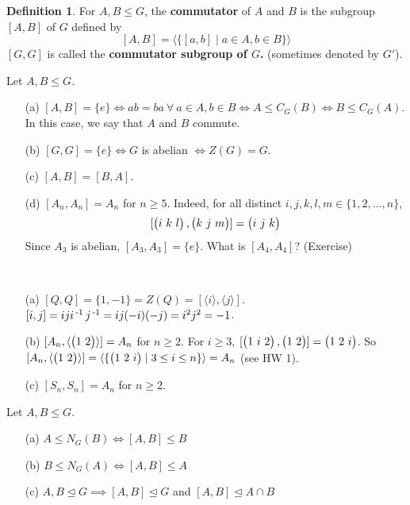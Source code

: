 \documentclass[11pt]{book}
\theoremstyle{definition}   \newtheorem{defn}[counter]{Definition} %
\newcommand{\nsg}{\mathrel{\unlhd}}   \newcommand{\ind}{\parindent24pt}   \newcommand{\vn}{\varnothing}
\newcommand{\vs}{\vspace{8pt}}
\numberwithin{counter}{chapter}
\begin{document}
\vs

\begin{defn}
For $A,B \leq G$, the \textbf{commutator} of $A$ and $B$ is the subgroup $[A,B]$ of $G$ defined by
	\[[A,B] = \langle \{[a,b] \mid a \in A, b \in B\}\rangle \]
$[G,G]$ is called the \textbf{commutator subgroup of $G$.} (sometimes denoted by $G'$).
\end{defn}

\vs

\begin{remark}
Let $A,B \leq G$. \\
\begin{enumerate}
\item[(a)] $[A,B] = \{e\} \iff ab = ba \ \forall\ a\in A, b \in B \iff A \leq C_G(B) \iff B \leq C_G(A)$. In this case, we say that $A$ and $B$ commute.
\item[(b)] $[G,G] = \{e\} \iff G$ is abelian $\iff Z(G) = G$.
\item[(c)] $[A,B] = [B,A]$.
\item[(d)] $[A_n,A_n] = A_n$ for $n \geq 5$. Indeed, for all distinct $i,j,k,l,m \in \{1,2,\dots,n\}$,
	\[[\cyc{i\ k\ l},\cyc{k\ j\ m}] = \cyc{i\ j\ k} \]
Since $A_3$ is abelian, $[A_3,A_3] = \{e\}$. What is $[A_4,A_4]$? (Exercise)
\end{enumerate}
\end{remark}

\vs

\begin{example}
\ \\
\begin{enumerate}
\item[(a)] $[Q,Q] = \{1,-1\} = Z(Q) = [\langle i \rangle, \langle j \rangle] $. $[i,j] = iji\operatorname{^{-1}} j\operatorname{^{-1}} = ij(-i)(-j) = i^2j^2 = -1$.
\item[(b)] $[A_n,\langle \begin{pmatrix} 1 \ 2 \end{pmatrix} \rangle] = A_n$ for $n \geq 2$. For $i \geq 3$, $[\cyc{1 \ i \ 2},\cyc{1 \ 2}] = \cyc{1 \ 2 \ i}$. So $[A_n,\langle \cyc{1 \ 2}\rangle] = \langle \{\cyc{1 \ 2 \ i} \mid 3 \leq i \leq n \} \rangle = A_n$ (see HW 1).
\item[(c)] $[S_n,S_n] = A_n$ for $n \geq 2$.
\end{enumerate}
\end{example}

\vs

\begin{lemma}
Let $A,B \leq G$.
	\begin{enumerate}
	\item[(a)] $A \leq N_G(B) \iff [A,B] \leq B$
	\item[(b)] $B \leq N_G(A) \iff [A,B] \leq A$
	\item[(c)] $A,B \nsg G \implies [A,B] \nsg G$ and $[A,B] \nsg A\cap B$
	\end{enumerate}
\end{lemma}
\end{document}
